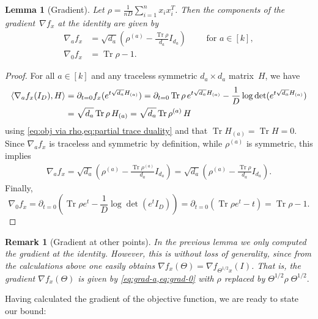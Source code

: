 \documentclass[aos]{imsart}
\newtheorem{lemma}[theorem]{Lemma}
\newtheorem{remark}[theorem]{Remark}
\theoremstyle{definition}
\numberwithin{equation}{section}
\DeclareMathOperator{\tr}{Tr}
\newcommand{\samp}{x}
\newcommand{\ef}{f}
\begin{document}
\begin{lemma}[Gradient]\label{lem:gradient}
Let $\rho = \frac{1}{nD} \sum_{i=1}^n \samp_i \samp_i^T $.
Then the components of the gradient~$\nabla f_x$ at the identity are given by
\begin{align}
 \nabla_a \ef_{\samp} &= \sqrt{d_a}\left( \rho^{(a)} - \frac{\tr\rho}{d_a} I_{d_a}\right)
  \qquad \text{ for } a \in [k], \label{eq:grad-a}\\
  \nabla_0 \ef_\samp &= \tr \rho - 1.\label{eq:grad-0}
\end{align}
\end{lemma}
\begin{proof}
For all $a\in[k]$ and any traceless symmetric $d_a\times d_a$ matrix~$H$, we have
\begin{align*}
\braket{\nabla_a f_x(I_D), H}
&= \partial_{t=0} f_x(e^{t\sqrt{d_a} H_{(a)}})
= \partial_{t=0} \tr \rho \, e^{t\sqrt{d_a} H_{(a)}} - \frac1D\log\det(e^{t\sqrt{d_a} H_{(a)}}) \\
&= \sqrt{d_a} \tr \rho \, H_{(a)}
= \sqrt{d_a} \tr \rho^{(a)} \, H
\end{align*}
using \cref{eq:obj via rho,eq:partial trace duality} and that $\tr H_{(a)} = \tr H = 0$.
Since $\nabla_a f_{\samp}$ is traceless and symmetric by definition, while $\rho^{(a)}$ is symmetric, this implies
\begin{align*}
  \nabla_a f_{\samp}
= \sqrt{d_a} \left( \rho^{(a)} - \frac{\tr \rho^{(a)}}{d_a} I_{d_a} \right)
= \sqrt{d_a} \left( \rho^{(a)} - \frac{\tr \rho}{d_a} I_{d_a} \right).
\end{align*}
Finally,
\[
  \nabla_0 f_x
= \partial_{t=0} \left( \tr \rho e^t - \frac1D \log \det(e^t I_D) \right)
= \partial_{t=0} \left( \tr \rho e^t - t \right)
= \tr \rho - 1.
\]
\end{proof}

\begin{remark}[Gradient at other points]\label{remark:gradient-everywhere}
    In the previous lemma we only computed the gradient at the identity. However, this is without loss of generality, since from the calculations above one easily obtains $\nabla f_{x}(\Theta) = \nabla f_{\Theta^{1/2} x}(I)$. That is, the gradient $\nabla f_{x}(\Theta)$ is given by \cref{eq:grad-a,eq:grad-0} with $\rho$ replaced by $\Theta^{1/2}\rho\; \Theta^{1/2}.$
\end{remark}

Having calculated the gradient of the objective function, we are ready to state our bound:
\end{document}
